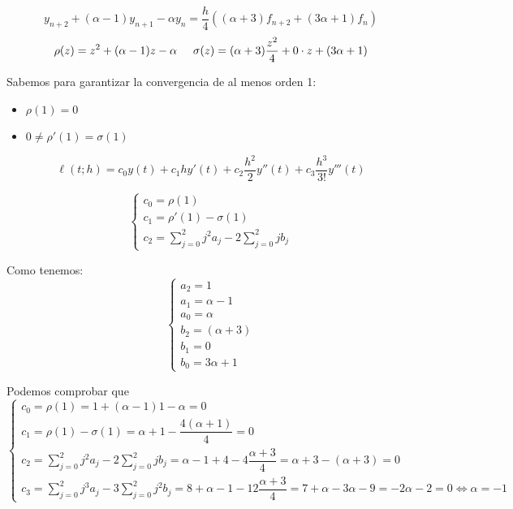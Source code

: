 \documentclass[openany]{book}
\begin{document}
    \setcounter{ex}{7}

    \begin{exercise}
       $$  y_{n+2} + (\alpha -1)y_{n+1} - \alpha y_n = \dfrac{h}{4}((\alpha+3)f_{n+2}+(3 \alpha +1 )f_n) $$
       $$ \rho(z) = z^2+(\alpha -1 )z -\alpha \hspace{5mm} \sigma(z) = (\alpha +3)\dfrac{z^2}{4} + 0\cdot z + (3 \alpha +1 ) $$

       Sabemos para garantizar la convergencia de al menos orden 1:
       \begin{itemize}
           \item $ \rho(1) = 0 $
           \item $ 0 \ne \rho'(1) = \sigma(1) $
       \end{itemize}

       $$ \ell(t;h) = c_0y(t)+c_1hy'(t)+c_2\dfrac{h^2}{2} y''(t) + c_3 \dfrac{h^3}{3!}y'''(t) $$

       $$ \left\{
       \begin{array}{l}
           c_0 = \rho(1)\\
           c_1 = \rho'(1)-\sigma(1)\\
           c_2 = \sum\limits_{j=0}^{2}j ^2 a_j - 2 \sum\limits_{j=0}^{2}jb_j
       \end{array}
       \right. $$

       Como tenemos:
       $$ \left\{
       \begin{array}{l}
           a_2 = 1\\
           a_1 = \alpha-1 \\
           a_0 = \alpha \\
           b_2 = (\alpha +3)\\
           b_1 = 0 \\
           b_0 = 3 \alpha +1 
       \end{array}
       \right. $$

       Podemos comprobar que 
       $$ \left\{
       \begin{array}{lr}
           c_0 = \rho(1) = 1 +(\alpha-1)1 - \alpha  = 0\\ 
           c_1 = \rho(1)-\sigma(1) = \alpha+1- \dfrac{4(\alpha +1)}{4} = 0 &  \\
           c_2 = \sum\limits_{j=0}^{2}j^2a_j -2 \sum\limits_{j=0}^{2}jb_j = \alpha-1+4-4 \dfrac{\alpha+3}{4} = \alpha +3 - (\alpha +3) = 0 & \\
           c_3 = \sum\limits_{j=0}^{2}j^3a_j - 3 \sum\limits_{j=0}^{2}j^2b_j = 8+ \alpha -1 -12 \dfrac{\alpha+3}{4} = 7+ \alpha -3 \alpha -9 = -2 \alpha -2 = 0 \iff \alpha = -1
       \end{array}
       \right. $$


\end{exercise}
\end{document}
